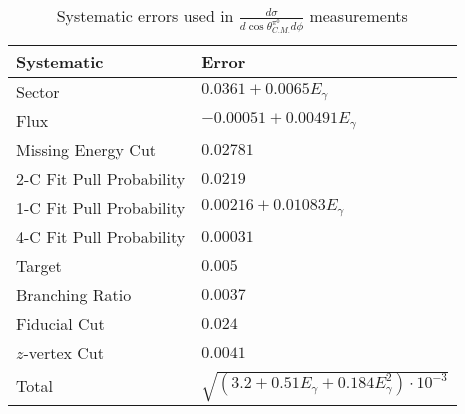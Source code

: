 \begin{table}[h!]
\begin{center}


\caption[Systematics]{\label{tab:systematics}Systematic errors used in $\frac{d\sigma}{d\cos\theta^{\pi^0}_{C.M.} d\phi}$ measurements \vspace{0.75mm}}

\begin{tabular}{p{5cm} | p{7cm}}
\hline
Systematic & Error \\
\hline
Sector  & $ 0.0361 + 0.0065E_{\gamma}$ \\
Flux  & $ -0.00051 + 0.00491E_{\gamma}$ \\
Missing Energy Cut  & $0.02781$ \\
2-C Fit Pull Probability & $0.0219$ \\
1-C Fit Pull Probability  & $ 0.00216 + 0.01083E_{\gamma}$ \\
4-C Fit Pull Probability  & $0.00031$ \\ 
Target  & $0.005$ \\
Branching Ratio  & $0.0037$ \\
Fiducial Cut & $0.024$ \\
$z$-vertex Cut & $0.0041$ \\
Total & $\sqrt{(3.2 +0.51E_{\gamma} +0.184E_{\gamma}^2)\cdot10^{-3}}$ \\
\hline \hline
\end{tabular}


\end{center}
\end{table}
\vspace{20pt}